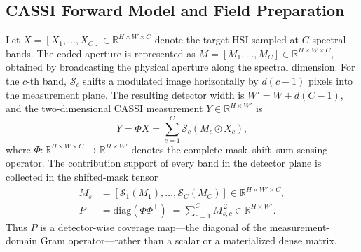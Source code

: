 \documentclass[letterpaper]{article} %
\begin{document}
\subsection{CASSI Forward Model and Field Preparation}

Let \(X=[X_1,\ldots,X_C]\in\mathbb{R}^{H\times W\times C}\) denote the target HSI sampled at \(C\) spectral bands.
The coded aperture is represented as \(M=[M_1,\ldots,M_C]\in\mathbb{R}^{H\times W\times C}\), obtained by broadcasting the physical aperture along the spectral dimension.
For the \(c\)-th band, \(\mathcal{S}_c\) shifts a modulated image horizontally by \(d(c-1)\) pixels into the measurement plane.
The resulting detector width is \(W'=W+d(C-1)\), and the two-dimensional CASSI measurement \(Y\in\mathbb{R}^{H\times W'}\) is
\begin{equation}
Y=\Phi X=\sum_{c=1}^{C}\mathcal{S}_{c}(M_c\odot X_c),
\label{eq:cassi_forward}
\end{equation}
where \(\Phi:\mathbb{R}^{H\times W\times C}\rightarrow\mathbb{R}^{H\times W'}\) denotes the complete mask--shift--sum sensing operator.
The contribution support of every band in the detector plane is collected in the shifted-mask tensor
\begin{align}
M_s&=\left[\mathcal{S}_1(M_1),\ldots,\mathcal{S}_C(M_C)\right]
\in\mathbb{R}^{H\times W'\times C}, \label{eq:shifted_mask}\\
P&=\mathrm{diag}(\Phi\Phi^\top)
\;=\sum_{c=1}^{C}M_{s,c}^{\,2}
\in\mathbb{R}^{H\times W'} .
\label{eq:shifted_mask_and_p}
\end{align}
Thus \(P\) is a detector-wise coverage map---the diagonal of the measurement-domain Gram operator---rather than a scalar or a materialized dense matrix.
\end{document}
